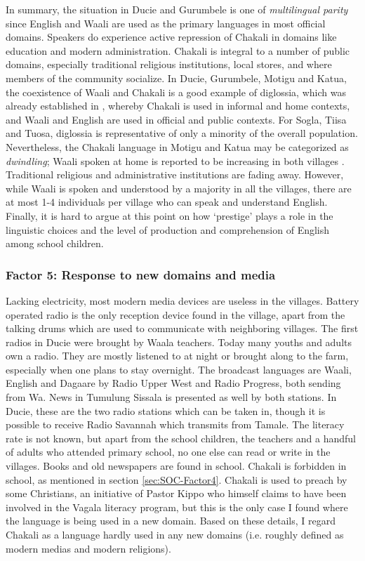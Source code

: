 In summary, the situation in Ducie and Gurumbele is one of {\it multilingual
parity} since English and Waali are used as the primary languages in most
official domains.  Speakers do experience active repression of Chakali in
domains like
education and modern administration. Chakali is integral to a number of public
domains, especially traditional religious institutions, local stores, and
  where members of the community socialize. In Ducie, Gurumbele,
Motigu and Katua, the coexistence of  Waali and Chakali  is a good example of
diglossia, which was already established in \cite{Tomp02},  whereby Chakali  is
used in  informal and home contexts,  and Waali and English are used in official
and
public contexts. For Sogla, Tiisa and Tuosa,  diglossia is representative of
only a  minority of the overall population.  Nevertheless, the  Chakali language
in Motigu and Katua may be categorized as {\it dwindling}; Waali spoken at home
is reported to be increasing in both villages . Traditional religious and
administrative institutions are fading away. However, while
Waali is spoken and understood by a majority in all the villages,  there are at
most 1-4 individuals per village who can speak and understand English.
Finally,
it is hard to argue at this point on how `prestige' plays a role in the
linguistic choices and  the level of production and comprehension of
English among school children.

\subsubsection{Factor 5: Response to new domains and media}
\label{sec:SOC-Factor5}

Lacking electricity,  most modern media devices   are useless in the 
villages.
Battery operated radio is the only reception device found in the village,
apart from the talking drums which are used to communicate with neighboring
villages.  The first radios in Ducie
were brought by Waala teachers. Today many youths and adults own a
radio. They are mostly
listened to at night or brought along to the farm, especially when one plans
to stay  overnight. The  broadcast languages are  Waali, English and
Dagaare by  Radio Upper West and Radio Progress, both
sending from Wa.  News in Tumulung
Sissala is presented as well by both stations.  In Ducie, these are the two
radio stations which can be taken in, though it is possible to receive Radio
Savannah which transmits from Tamale. The literacy rate is not known, but
apart from the school children, the teachers and a handful of adults who
attended primary school, no one else can read or write in the villages. Books
and
old newspapers are found in school. Chakali is forbidden in school, as
mentioned in section \ref{sec:SOC-Factor4}. Chakali is used to preach by some
Christians, an initiative of Pastor Kippo who himself claims to have been
involved in the Vagala literacy program, but this is the only case I found
where the language is being used in a new domain. Based on these details, I
regard 
Chakali as a language  hardly used in any
new domains (i.e. roughly defined as modern medias and modern religions).


